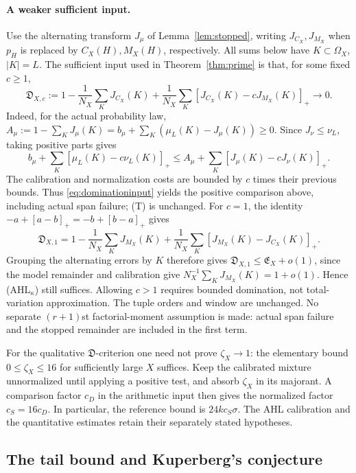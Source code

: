 \documentclass[11pt,a4paper]{article}
\begin{document}
\paragraph{A weaker sufficient input.}
Use the alternating transform $J_\mu$ of Lemma~\ref{lem:stopped},
writing $J_{C_X},J_{M_X}$ when $p_H$ is replaced by $C_X(H),M_X(H)$,
respectively. All sums below have $K\subset\Omega_X$, $|K|=L$.
The sufficient input used in Theorem~\ref{thm:prime} is that, for some fixed $c\ge1$,
\begin{equation}\label{eq:dominationinput}
 \mathfrak D_{X,c}:=
 1-\frac1{N_X}\sum_KJ_{C_X}(K)
 +\frac1{N_X}\sum_K[J_{C_X}(K)-cJ_{M_X}(K)]_+
 \longrightarrow0.
\end{equation}
Indeed, for the actual probability law,
$A_\mu:=1-\sum_KJ_\mu(K)=b_\mu+\sum_K(\mu_L(K)-J_\mu(K))\ge0$.
Since $J_\nu\le\nu_L$, taking positive parts gives
\[
 b_\mu+\sum_K[\mu_L(K)-c\nu_L(K)]_+
 \le A_\mu+\sum_K[J_\mu(K)-cJ_\nu(K)]_+.
\]
The calibration and normalization costs are bounded by $c$ times their
previous bounds. Thus \eqref{eq:dominationinput} yields the positive
comparison above, including actual span failure; (T) is unchanged.
For $c=1$, the identity $-a+[a-b]_+=-b+[b-a]_+$ gives
\begin{equation}\label{eq:dominationidentity}
 \mathfrak D_{X,1}
 =1-\frac1{N_X}\sum_KJ_{M_X}(K)
  +\frac1{N_X}\sum_K[J_{M_X}(K)-J_{C_X}(K)]_+.
\end{equation}
Grouping the alternating errors by $K$ therefore gives
$\mathfrak D_{X,1}\le\mathfrak E_X+o(1)$, since the model remainder
and calibration give $N_X^{-1}\sum_KJ_{M_X}(K)=1+o(1)$.
Hence (AHL$_\kappa$) still suffices. Allowing $c>1$ requires bounded
domination, not total-variation approximation.
The tuple orders and window are unchanged. No separate $(r+1)$st
factorial-moment assumption is made: actual span failure and the
stopped remainder are included in the first term.

For the qualitative $\mathfrak D$-criterion one need not prove
$\zeta_X\to1$: the elementary bound $0\le\zeta_X\le16$ for
sufficiently large $X$ suffices. Keep the calibrated mixture
unnormalized until applying a positive test, and absorb $\zeta_X$
in its majorant. A comparison factor $c_D$ in the arithmetic input
then gives the normalized factor $c_S=16c_D$. In particular, the
reference bound is $24k c_S\sigma$. The AHL calibration and the
quantitative estimates retain their separately stated hypotheses.

\subsection[Tail bound and Kuperberg input]{The tail bound and Kuperberg's conjecture}
\end{document}

